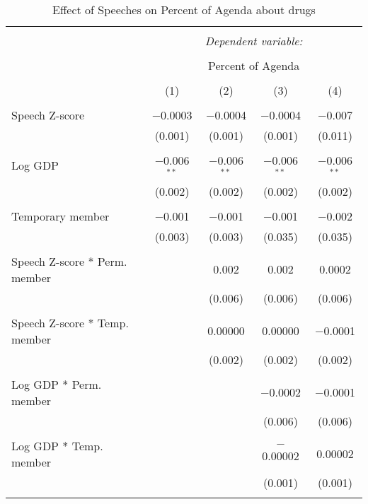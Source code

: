
\begin{table}[!htbp] \centering 
  \caption{Effect of Speeches on Percent of Agenda about drugs} 
  \label{} 
\begin{tabular}{@{\extracolsep{5pt}}lcccc} 
\\[-1.8ex]\hline 
\hline \\[-1.8ex] 
 & \multicolumn{4}{c}{\textit{Dependent variable:}} \\ 
\cline{2-5} 
\\[-1.8ex] & \multicolumn{4}{c}{Percent of Agenda} \\ 
\\[-1.8ex] & (1) & (2) & (3) & (4)\\ 
\hline \\[-1.8ex] 
 Speech Z-score & $-$0.0003 & $-$0.0004 & $-$0.0004 & $-$0.007 \\ 
  & (0.001) & (0.001) & (0.001) & (0.011) \\ 
  & & & & \\ 
 Log GDP & $-$0.006$^{**}$ & $-$0.006$^{**}$ & $-$0.006$^{**}$ & $-$0.006$^{**}$ \\ 
  & (0.002) & (0.002) & (0.002) & (0.002) \\ 
  & & & & \\ 
 Temporary member & $-$0.001 & $-$0.001 & $-$0.001 & $-$0.002 \\ 
  & (0.003) & (0.003) & (0.035) & (0.035) \\ 
  & & & & \\ 
 Speech Z-score * Perm. member &  & 0.002 & 0.002 & 0.0002 \\ 
  &  & (0.006) & (0.006) & (0.006) \\ 
  & & & & \\ 
 Speech Z-score * Temp. member &  & 0.00000 & 0.00000 & $-$0.0001 \\ 
  &  & (0.002) & (0.002) & (0.002) \\ 
  & & & & \\ 
 Log GDP * Perm. member &  &  & $-$0.0002 & $-$0.0001 \\ 
  &  &  & (0.006) & (0.006) \\ 
  & & & & \\ 
 Log GDP * Temp. member &  &  & $-$0.00002 & 0.00002 \\ 
  &  &  & (0.001) & (0.001) \\ 
  & & & & \\ 

\end{tabular}
\end{table}
